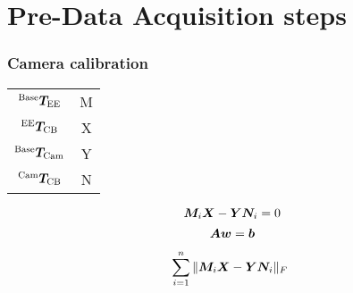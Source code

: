\section{Pre-Data Acquisition steps}
\begin{frame}
	\frametitle{Camera calibration}
	\begin{table}[hbt]
		\centering
		\begin{tabular}{|c|c|}
			\hline
			${}^\mathrm{Base} \bm{T}_\mathrm{EE}$ & M \\
			${}^\mathrm{EE} \bm{T}_\mathrm{CB}$ & X \\
			${}^\mathrm{Base} \bm{T}_\mathrm{Cam}$ & Y \\
			${}^\mathrm{Cam} \bm{T}_\mathrm{CB}$ & N \\
			\hline
		\end{tabular}
	\end{table}
	\begin{equation}
	\bm{M}_i\bm{X} - \bm{Y}\bm{N}_i = 0 
	\label{eq:hand-eye}
	\end{equation}
	\begin{equation}
	\centering
	\begin{split}
	\matr{A} \vect{w} = \vect{b}\\
	\end{split}
	\label{eq:hand-eye_least_square}
	\end{equation}
	\begin{equation}
	\sum_{i=1}^n \|\bm{M}_i\bm{X} - \bm{Y}\bm{N}_i\|_{F}\
	\end{equation}

\end{frame}





